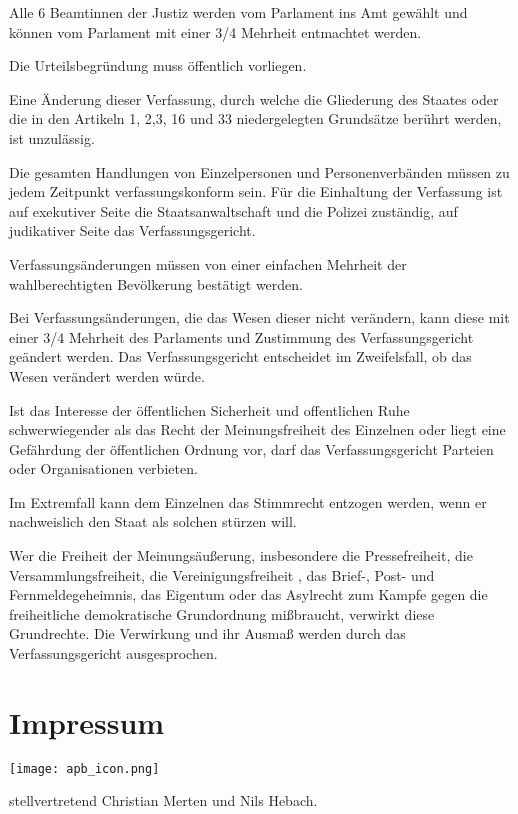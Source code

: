 \documentclass{sasbase}
\begin{document}
\begin{article}
	\item Alle 6 Beamtinnen der Justiz werden vom Parlament ins Amt gewählt und können vom Parlament mit einer 3/4 Mehrheit entmachtet werden.
	\item Die Urteilsbegründung muss öffentlich vorliegen.
\end{article}


\begin{article}[Ewigkeitsklausel]
	\item Eine Änderung dieser Verfassung, durch welche die Gliederung des Staates oder die in den Artikeln 1, 2,3, 16 und 33 niedergelegten Grundsätze berührt werden, ist unzulässig.
\end{article}

\begin{article}
	\item Die gesamten Handlungen von Einzelpersonen und Personenverbänden müssen zu jedem Zeitpunkt verfassungskonform sein. Für die Einhaltung der Verfassung ist auf exekutiver Seite die Staatsanwaltschaft und die Polizei zuständig, auf judikativer Seite das Verfassungsgericht.
	\item Verfassungsänderungen müssen von einer einfachen Mehrheit der wahlberechtigten Bevölkerung bestätigt werden.
	\item Bei Verfassungsänderungen, die das Wesen dieser nicht verändern, kann diese mit einer 3/4 Mehrheit des Parlaments und Zustimmung des Verfassungsgericht geändert werden. Das Verfassungsgericht entscheidet im Zweifelsfall, ob das Wesen verändert werden würde.
\end{article}

\begin{article}
	\item Ist das Interesse der öffentlichen Sicherheit und offentlichen Ruhe schwerwiegender als das Recht der Meinungsfreiheit des Einzelnen oder liegt eine Gefährdung der öffentlichen Ordnung vor, darf das Verfassungsgericht Parteien oder Organisationen verbieten.
	\item Im Extremfall kann dem Einzelnen das Stimmrecht entzogen werden, wenn er nachweislich den Staat als solchen stürzen will.
	\item Wer die Freiheit der Meinungsäußerung, insbesondere die Pressefreiheit, die Versammlungsfreiheit, die Vereinigungsfreiheit , das Brief-, Post- und Fernmeldegeheimnis, das Eigentum oder das Asylrecht zum Kampfe gegen die freiheitliche demokratische Grundordnung mißbraucht, verwirkt diese Grundrechte. Die Verwirkung und ihr Ausmaß werden durch das Verfassungsgericht ausgesprochen.
\end{article}

\section{Impressum}
\begin{minipage}{0.4\linewidth}
\texttt{[image: apb\_icon.png]}
\end{minipage}
\begin{minipage}{0.5\linewidth}
{\raggedright stellvertretend Christian Merten und Nils Hebach.}
\end{minipage}
\end{document}
